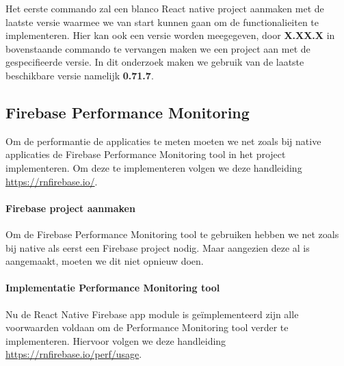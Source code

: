 Het eerste commando zal een blanco React native project aanmaken met de laatste versie 
waarmee we van start kunnen gaan om de functionalieiten te implementeren. Hier kan ook 
een versie worden meegegeven, door \textbf{X.XX.X} in bovenstaande commando te vervangen 
maken we een project aan met de gespecifieerde versie. In dit onderzoek maken we gebruik 
van de laatste beschikbare versie namelijk \textbf{0.71.7}.

\subsection{Firebase Performance Monitoring}
Om de performantie de applicaties te meten moeten we net zoals bij native applicaties de 
Firebase Performance Monitoring tool in het project implementeren. Om deze te implementeren 
volgen we deze handleiding \url{https://rnfirebase.io/}.

\paragraph{Firebase project aanmaken}
Om de Firebase Performance Monitoring tool te gebruiken hebben we net zoals bij native 
als eerst een Firebase project nodig. Maar aangezien deze al is aangemaakt, moeten we dit 
niet opnieuw doen.



\paragraph{Implementatie Performance Monitoring tool}
Nu de React Native Firebase app module is geïmplementeerd zijn alle voorwaarden voldaan om de 
Performance Monitoring tool verder te implementeren. Hiervoor volgen we deze handleiding 
\url{https://rnfirebase.io/perf/usage}.

